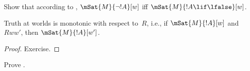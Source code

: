 \documentclass[../../../include/open-logic-section]{subfiles}
\begin{document}
\begin{prob}
  Show that according to ,
  $\mSat{M}{\lnot !A}[w]$ iff $\mSat{M}{!A \lif \lfalse}[w]$.
\end{prob}

\begin{prop}
  Truth at worlds is monotonic with respect to~$R$, i.e., if
  $\mSat{M}{!A}[w]$ and $Rww'$, then $\mSat{M}{!A}[w']$.
\end{prop}

\begin{proof}
  Exercise.
\end{proof}

\begin{prob}
  Prove .
\end{prob}
\end{document}
